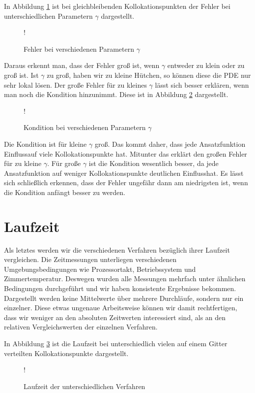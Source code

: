 In Abbildung \ref{fig:gamma-fehler} ist bei gleichbleibenden Kollokationspunkten der Fehler bei unterschiedlichen Parametern $\gamma$ dargestellt.

\begin{figure}[ht]
\centering
\resizebox {\columnwidth} {!} {

}
\caption{Fehler bei verschiedenen Parametern $\gamma$}
\label{fig:gamma-fehler}
\end{figure}

Daraus erkennt man, dass der Fehler groß ist, wenn $\gamma$ entweder zu klein oder zu groß ist. Ist $\gamma$ zu groß, haben wir zu kleine \glqq Hütchen\grqq , so können diese die \ac{PDE} nur sehr lokal lösen. Der große Fehler für zu kleines $\gamma$ lässt sich besser erklären, wenn man noch die Kondition hinzunimmt. Diese ist in Abbildung \ref{fig:kondition} dargestellt.

\begin{figure}[ht]
\centering
\resizebox {\columnwidth} {!} {

}
\caption{Kondition bei verschiedenen Parametern $\gamma$}
\label{fig:kondition}
\end{figure}

Die Kondition ist für kleine $\gamma$ groß. Das kommt daher, dass jede Ansatzfunktion \glqq Einfluss\grqq  auf viele Kollokationspunkte hat. Mitunter das erklärt den großen Fehler für zu kleine $\gamma$. Für große $\gamma$ ist die Kondition wesentlich besser, da jede Ansatzfunktion auf weniger Kollokationspunkte deutlichen \glqq Einfluss\grqq  hat. Es lässt sich schließlich erkennen, dass der Fehler ungefähr dann am niedrigsten ist, wenn die Kondition anfängt besser zu werden. 

\section{Laufzeit}
Als letztes werden wir die verschiedenen Verfahren bezüglich ihrer Laufzeit vergleichen. Die Zeitmessungen unterliegen verschiedenen Umgebungsbedingungen wie Prozessortakt, Betriebssystem und Zimmertemperatur. Deswegen wurden alle Messungen mehrfach unter ähnlichen Bedingungen durchgeführt und wir haben konsistente Ergebnisse bekommen. Dargestellt werden keine Mittelwerte über mehrere Durchläufe, sondern nur ein einzelner. Diese etwas ungenaue Arbeitsweise können wir damit rechtfertigen, dass wir weniger an den absoluten Zeitwerten interessiert sind, als an den relativen Vergleichswerten der einzelnen Verfahren.

In Abbildung \ref{fig:Laufzeit} ist die Laufzeit bei unterschiedlich vielen auf einem Gitter verteilten Kollokationspunkte dargestellt.
\begin{figure}[ht]
\centering
\resizebox {\columnwidth} {!} {

}
\caption{Laufzeit der unterschiedlichen Verfahren}
\label{fig:Laufzeit}
\end{figure}

